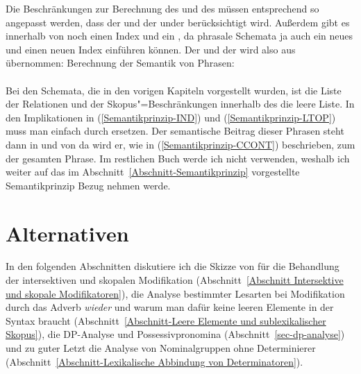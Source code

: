 \noindent
Die Beschränkungen zur Berechnung des \relswes und des \hconswes müssen entsprechend so angepasst
werden, dass der \relsw und der \hconsw under \ccont berücksichtigt wird. Außerdem gibt es innerhalb
von \ccont noch einen Index und ein \ltop, da phrasale Schemata ja auch ein neues \ltop und einen
neuen Index einführen können. Der \indw und der \ltopw wird also aus \ccont übernommen:   
\eas
\label{Semantikprinzip-CCONT}%
Berechnung der Semantik von Phrasen:\\
 \impl\\[1mm]
\zs
Bei den Schemata, die in den vorigen  Kapiteln vorgestellt wurden, ist die Liste der Relationen und
der Skopus"=Beschränkungen innerhalb des \ccontwes die leere Liste. In den Implikationen in (\ref{Semantikprinzip-IND})
und (\ref{Semantikprinzip-LTOP}) muss man \cont einfach durch \ccont ersetzen. Der semantische Beitrag dieser Phrasen
steht dann in \ccont und von da wird er, wie in (\ref{Semantikprinzip-CCONT}) beschrieben, zum \contw
der gesamten Phrase. Im restlichen Buch werde ich \ccont nicht verwenden, weshalb ich weiter auf das
im Abschnitt~\ref{Abschnitt-Semantikprinzip} vorgestellte Semantikprinzip Bezug nehmen werde.




\section{Alternativen}

In den folgenden Abschnitten diskutiere ich die Skizze von \citet*{CFPS2005a} für die Behandlung der
intersektiven und skopalen Modifikation (Abschnitt~\ref{Abschnitt Intersektive und skopale Modifikatoren}), die Analyse bestimmter Lesarten bei Modifikation durch das
Adverb \emph{wieder} und warum man dafür keine leeren Elemente in der Syntax braucht (Abschnitt~\ref{Abschnitt-Leere Elemente und sublexikalischer Skopus}), die DP-Analyse
und Possessivpronomina (Abschnitt~\ref{sec-dp-analyse}) und zu guter Letzt die Analyse von
Nominalgruppen ohne Determinierer (Abschnitt~\ref{Abschnitt-Lexikalische Abbindung von Determinatoren}).  

